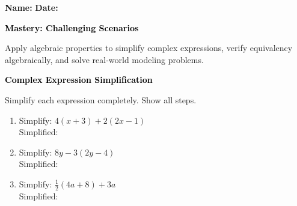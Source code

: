 \documentclass[12pt, letterpaper, fleqn]{article}
\newcommand{\blanklong}{\underline{\hspace{6.5cm}}}
\begin{document}
\textbf{Name:} \underline{\hspace{5cm}}
\hfill
\textbf{Date:} \underline{\hspace{3cm}}\\

\begin{tcolorbox}[colback=black!10]
    \large\textcolor{black}{\textbf{Mastery: Challenging Scenarios}}
\end{tcolorbox}

\vspace{3mm}
\noindent
Apply algebraic properties to simplify complex expressions, verify equivalency algebraically, and solve real-world modeling problems.

\vspace{4mm}

\begin{tcolorbox}[colback=black!10]
\large\textcolor{black}{\textbf{Complex Expression Simplification}}
\end{tcolorbox}

\noindent
Simplify each expression completely. Show all steps.

\vspace{3mm}

\begin{enumerate}[itemsep=2.2cm, leftmargin=0.6cm]

\item Simplify: $4(x + 3) + 2(2x - 1)$ \\
Simplified: \blanklong

\vspace{2cm}

\item Simplify: $8y - 3(2y - 4)$ \\
Simplified: \blanklong

\vspace{2cm}

\item Simplify: $\frac{1}{2}(4a + 8) + 3a$ \\
Simplified: \blanklong

\vspace{2cm}

\end{enumerate}
\end{document}
